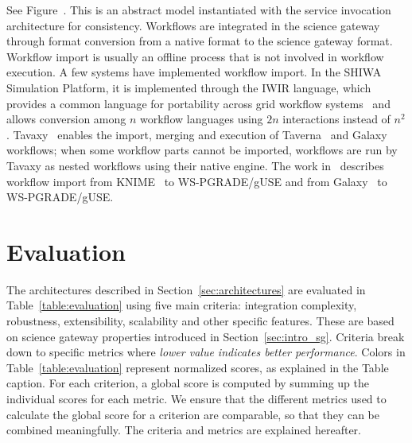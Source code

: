 \documentclass[preprint,3p,twocolumn]{elsarticle}
\newcommand{\note}[2]{\pdfmargincomment[color=yellow,author=#1,open=true]{#2}}
\newcommand{\closednote}[4]{} %
\begin{document}
See Figure~. This is an abstract model
instantiated with the service invocation architecture for
consistency. Workflows are integrated in the science gateway through
format conversion from a native format to the science gateway
format. Workflow import is usually an offline process that is not
involved in workflow execution. A few systems have implemented
workflow import. In the SHIWA Simulation Platform, it is implemented
through the IWIR language, which provides a common language for
portability across grid workflow
systems~\cite{plankensteiner-prodan-etal:2013} and allows conversion
among $n$ workflow languages using $2n$ interactions instead of $n^2$.
Tavaxy~\cite{Abouelhoda2012}
enables the import, merging and execution of Taverna~\cite{oinn2004taverna} and
Galaxy~\cite{goecks2010galaxy} workflows; when some workflow parts
cannot be imported, workflows are run by Tavaxy as nested workflows
using their native engine. The work in~\cite{delaGarza2016} describes
workflow import from KNIME~\cite{Berthold2008} to WS-PGRADE/gUSE and
from Galaxy~\cite{goecks2010galaxy} to WS-PGRADE/gUSE.
\closednote{Tristan}{Add description of a real system}{Tristan}{Would
  require to reproduce a figure from another paper. The concept seems
  simple enough to not require a figure.}


\section{Evaluation}

\label{sec:evaluation}

The architectures described in Section~\ref{sec:architectures} are
evaluated in Table~\ref{table:evaluation} using five main criteria:
integration complexity, robustness, extensibility, scalability and
other specific features. These are based on science gateway properties
introduced in Section~\ref{sec:intro_sg}. Criteria break down to
specific metrics where \emph{lower value indicates better
  performance}. Colors in Table~\ref{table:evaluation} represent
normalized scores, as explained in the Table caption. For each
criterion, a global score is computed by summing up the individual
scores for each metric. We ensure that the different metrics used to
calculate the global score for a criterion are comparable, so that
they can be combined meaningfully. The criteria and metrics are
explained hereafter.
\end{document}
